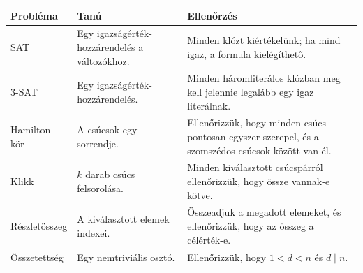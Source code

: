 \begin{tabularx}{\textwidth}{L{30mm}L{41mm}X}
\toprule
\textbf{Probléma} & \textbf{Tanú} & \textbf{Ellenőrzés} \\
\midrule
SAT & Egy igazságérték-hozzárendelés a változókhoz. & Minden klózt kiértékelünk; ha mind igaz, a formula kielégíthető. \\
3-SAT & Egy igazságérték-hozzárendelés. & Minden háromliterálos klózban meg kell jelennie legalább egy igaz literálnak. \\
Hamilton-kör & A csúcsok egy sorrendje. & Ellenőrizzük, hogy minden csúcs pontosan egyszer szerepel, és a szomszédos csúcsok között van él. \\
Klikk & $k$ darab csúcs felsorolása. & Minden kiválasztott csúcspárról ellenőrizzük, hogy össze vannak-e kötve. \\
Részletösszeg & A kiválasztott elemek indexei. & Összeadjuk a megadott elemeket, és ellenőrizzük, hogy az összeg a célérték-e. \\
Összetettség & Egy nemtriviális osztó. & Ellenőrizzük, hogy $1<d<n$ és $d\mid n$. \\
\bottomrule
\end{tabularx}
